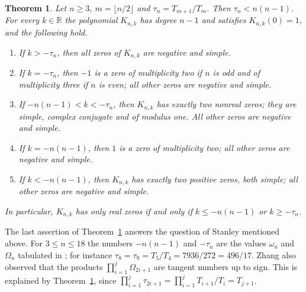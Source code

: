 \documentclass{amsart}
\newtheorem{theorem}{Theorem}[section]
\theoremstyle{remark}
\numberwithin{equation}{section}
\newcommand{\RR}{\mathbb{R}}
\begin{document}
\begin{theorem}\label{thm:zeros}
Let $n\ge 3$, $m=\lfloor n/2\rfloor$ and $\tau_n=T_{m+1}/T_m$. Then
$\tau_n<n(n-1)$. For every $k\in\RR$ the polynomial $K_{n,k}$ has degree
$n-1$ and satisfies $K_{n,k}(0)=1$, and the following hold.
\begin{enumerate}
\item[(a)] If $k>-\tau_n$, then all zeros of $K_{n,k}$ are negative and
simple.
\item[(b)] If $k=-\tau_n$, then $-1$ is a zero of multiplicity two if $n$ is
odd and of multiplicity three if $n$ is even; all other zeros are negative
and simple.
\item[(c)] If $-n(n-1)<k<-\tau_n$, then $K_{n,k}$ has exactly two nonreal
zeros; they are simple, complex conjugate and of modulus one. All other
zeros are negative and simple.
\item[(d)] If $k=-n(n-1)$, then $1$ is a zero of multiplicity two; all other
zeros are negative and simple.
\item[(e)] If $k<-n(n-1)$, then $K_{n,k}$ has exactly two positive zeros,
both simple; all other zeros are negative and simple.
\end{enumerate}
In particular, $K_{n,k}$ has only real zeros if and only if
$k\le -n(n-1)$ or $k\ge -\tau_n$.
\end{theorem}

The last assertion of Theorem~\ref{thm:zeros} answers the question of
Stanley mentioned above. For $3\le n\le 18$ the numbers $-n(n-1)$ and $-\tau_n$ are the values
$\omega_n$ and $\Omega_n$ tabulated in \cite[Section 3]{Zhang}; for instance
$\tau_8=\tau_9=T_5/T_4=7936/272=496/17$. Zhang also observed that the
products $\prod_{i=1}^{j}\Omega_{2i+1}$ are tangent numbers up to sign. This
is explained by Theorem~\ref{thm:zeros}, since
$\prod_{i=1}^{j}\tau_{2i+1}=\prod_{i=1}^{j}T_{i+1}/T_i=T_{j+1}$.
\end{document}
